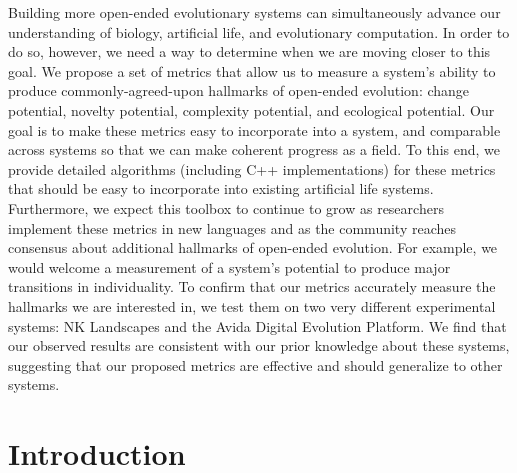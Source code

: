 \documentclass[letterpaper]{article}
\begin{document}
Building more open-ended evolutionary systems can simultaneously advance our understanding of biology, artificial life, and evolutionary computation. In order to do so, however, we need a way to determine when we are moving closer to this goal. We propose a set of metrics that allow us to measure a system's ability to produce commonly-agreed-upon hallmarks of open-ended evolution: change potential, novelty potential, complexity potential, and ecological potential. Our goal is to make these metrics easy to incorporate into a system, and comparable across systems so that we can make coherent progress as a field. To this end, we provide detailed algorithms (including C++ implementations) for these metrics that should be easy to incorporate into existing artificial life systems. Furthermore, we expect this toolbox to continue to grow as researchers implement these metrics in new languages and as the community reaches consensus about additional hallmarks of open-ended evolution. %
For example, we would welcome a measurement of a system's potential to produce major transitions in individuality. To confirm that our metrics accurately measure the hallmarks we are interested in, we test them on two very different experimental systems: NK Landscapes and the Avida Digital Evolution Platform. We find that our observed results are consistent with our prior knowledge about these systems, suggesting that our proposed metrics are effective and should generalize to other systems.


\newpage

\maketitle

\vspace{1.1in}


\section{Introduction}
\end{document}
